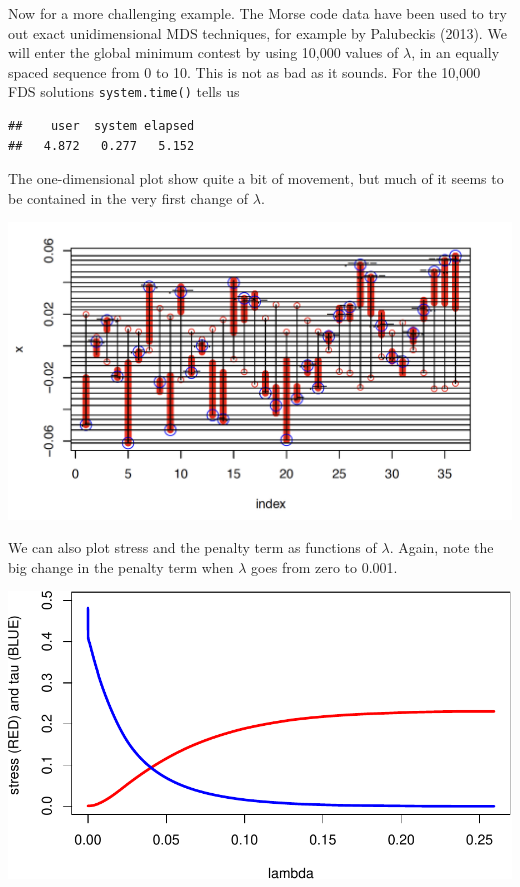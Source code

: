 \documentclass[
  12pt,
]{article}
\begin{document}
Now for a more challenging example. The Morse code data have been used
to try out exact unidimensional MDS techniques, for example by
Palubeckis (2013). We will enter the global minimum contest by using
10,000 values of \(\lambda\), in an equally spaced sequence from 0 to
10. This is not as bad as it sounds. For the 10,000 FDS solutions
\texttt{system.time()} tells us

\begin{verbatim}
##    user  system elapsed 
##   4.872   0.277   5.152
\end{verbatim}

The one-dimensional plot show quite a bit of movement, but much of it
seems to be contained in the very first change of \(\lambda\).

\begin{center}\includegraphics[width=0.85\linewidth]{morse} \end{center}

We can also plot stress and the penalty term as functions of
\(\lambda\). Again, note the big change in the penalty term when
\(\lambda\) goes from zero to 0.001.

\begin{center}\includegraphics{penalty_files/figure-latex/iter-1} \end{center}
\end{document}

